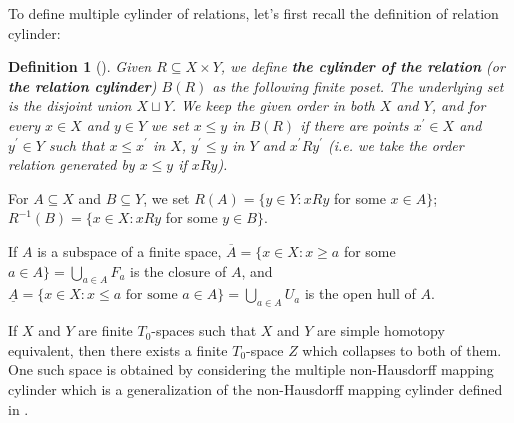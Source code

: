 \documentclass[12pt,a4paper,twoside, reqno, tbtags]{article}
\numberwithin{equation}{section}
\newtheorem{definition}{Definition}[section]
\begin{document}
    \noindent To define multiple cylinder of relations, let's first recall the definition of relation cylinder: 
\begin{definition}[\textnormal{\cite{Ximena}}]\label{d}
    Given $R\subseteq X\times Y$, we define \textbf{the cylinder of the relation} (or \textbf{the relation cylinder}) $B(R)$ as the following finite poset. The underlying set is the disjoint union $X \sqcup Y$. We keep the given order in both
    $X$ and $Y$, and for every $x\in X$ and $y \in Y$ we set $x\leq y$ in $B(R)$ if there are points $x^\prime \in X$ and $y^\prime \in Y$
    such that $x \leq x^\prime$ in $X$, $y^\prime \leq y$ in $Y$ and $x^\prime Ry^\prime$ (i.e. we take the order relation generated by $x \leq y$ if $xRy$).
\end{definition}
    \noindent For $A\subseteq X$ and $B \subseteq Y$, we set $R(A) = \{y \in Y : xRy$ for some $x \in A\}$; $R^{-1}(B) = \{x \in X : xRy$ for some $y \in B\}$.
    
    \noindent If $A$ is a subspace of a finite space, $\overline{A} = \{x \in X : x \geq a$ for some $a \in A\} = \bigcup_{a\in A} F_a$ is the closure of $A$, and $\underline{A} = \{ x \in X : x \leq a \text{ for some } a \in A \} = \bigcup_{a \in A} U_a$ is the open hull of $A$.
    
    \noindent If $X$ and $Y$  are finite $T_0$-spaces such that $X$ and $Y$ are simple homotopy equivalent, then there exists a finite $T_0$-space $Z$ which collapses to both of them. One such space is obtained by considering the multiple non-Hausdorff mapping cylinder \cite{Barmak} which is a generalization of the non-Hausdorff mapping cylinder defined in \cite{Barmak}.
    
\end{document}
